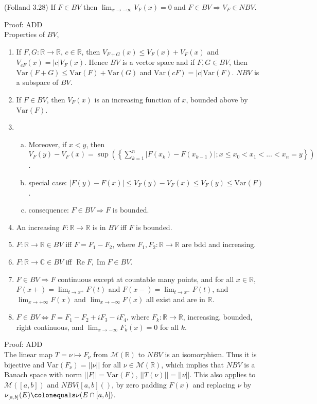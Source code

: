 \documentclass[12pt]{article}
\newcommand{\reals}[0] { \mathbb{R}}
\newcommand{\complexes}[0] { \mathbb{C}}
\newcommand{\M}[0] { \mathcal{M} }
\renewcommand{\Re}{ \operatorname{Re} }
\renewcommand{\Im}{ \operatorname{Im} }
\newcommand{\rimply}[0] { \Rightarrow }
\newcommand{\lrimply}[0] { \Leftrightarrow }
\newcommand{\rarw}[0] { \rightarrow }
\newcommand{ \defeq }[0] { \colonequals }
\newcommand{ \Var } { \textrm{Var} }
\begin{document}
(Folland 3.28) If $F \in BV$ then $\lim_{x \rarw - \infty} V_F(x) = 0$ and $F \in BV \rimply V_F \in NBV$.

\noindent
Proof: ADD \\


Properties of $BV$,

\begin{enumerate}[1)]
\item
If $F,G: \reals \rarw \reals$, $c \in \reals$, then $V_{F+G}(x) \le V_F(x) + V_F(x)$ and $V_{cF}(x) = |c| V_F(x)$. Hence $BV$ is a vector space and if $F,G \in BV$, then $\Var(F+G) \le \Var(F) + \Var(G)$ and $\Var(cF) = |c| \Var(F)$. $NBV$ is a subspace of $BV$.
\item
If $F \in BV$, then $V_F(x)$ is an increasing function of $x$, bounded above by $\Var(F)$.
\item
\begin{enumerate}[a)]
\item
Moreover, if $x < y$, then $V_F(y)-V_F(x) = \sup \left( \left\{ \sum_{k=1}^n | F(x_k) - F(x_{k-1}) | ; x \le x_0 < x_1 < ... < x_{n} = y \right\} \right)$.
\item
special case: $|F(y) - F(x)| \le V_F(y) - V_F(x) \le V_F(y) \le \Var(F)$.
\item
consequence: $F \in BV \rimply F$ is bounded.
\end{enumerate}
\item
An increasing $F: \reals \rarw \reals$ is in $BV$ iff $F$ is bounded.
\item
$F: \reals \rarw \reals \in BV$ iff $F =  F_1-F_2$, where $F_1,F_2: \reals \rarw \reals$ are bdd and increasing.
\item
$F: \reals \rarw \complexes \in BV$ iff $\Re F, \Im F \in BV$.
\item
$F \in BV \rimply F$ continuous except at countable many points, and for all $x \in \reals$, $F(x+) = \lim_{t \rarw x^+} F(t)$ and $F(x-) = \lim_{t \rarw x^-} F(t)$, and $\lim_{x \rarw +\infty} F(x)$ and $\lim_{x \rarw -\infty} F(x)$ all exist and are in $\reals$.
\item
 $F \in BV \lrimply F = F_1 - F_2 + i F_3 - i F_4$, where $F_k : \reals \rarw \reals$, increasing, bounded, right continuous, and $\lim_{x \rarw - \infty} F_k(x) = 0$ for all $k$.
\end{enumerate}


\noindent
Proof: ADD \\


The linear map $T = \nu \mapsto F_\nu$ from $\M(\reals)$ to $NBV$ is an isomorphism. Thus it is bijective and $\Var(F_\nu) = ||\nu||$ for all $\nu \in \M(\reals)$, which implies that $NBV$ is a Banach space with norm $||F|| = \Var(F)$, $||T(\nu)|| = ||\nu||$.  This also applies to $\M([a,b])$ and $NBV([a,b]()$, by zero padding $F(x)$ and replacing $\nu$ by $\nu_{[a,b]}(E) \defeq \nu(E \cap [a,b])$. \\
\end{document}
